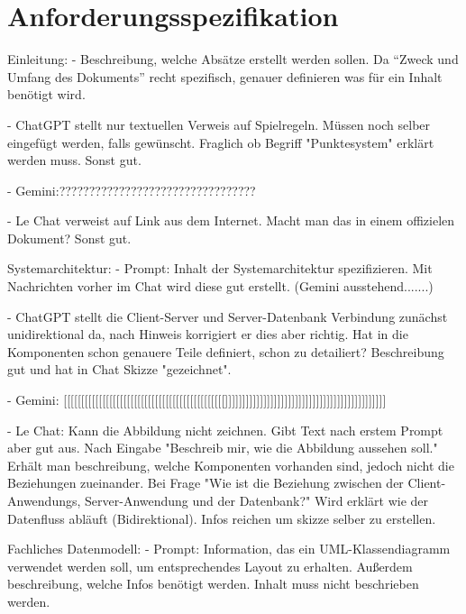 \section{Anforderungsspezifikation}  \label{CompAnforderungsspezifikation}

Einleitung:
- Beschreibung, welche Absätze erstellt werden sollen. Da ``Zweck und Umfang des Dokuments'' recht spezifisch, genauer definieren was für ein 
Inhalt benötigt wird.

- ChatGPT stellt nur textuellen Verweis auf Spielregeln. Müssen noch selber eingefügt werden, falls gewünscht. Fraglich ob Begriff "Punktesystem"
erklärt werden muss. Sonst gut.

- Gemini:?????????????????????????????????

- Le Chat verweist auf Link aus dem Internet. Macht man das in einem offizielen Dokument? Sonst gut.


Systemarchitektur:
- Prompt: Inhalt der Systemarchitektur spezifizieren. Mit Nachrichten vorher im Chat wird diese gut erstellt. (Gemini ausstehend.......)

- ChatGPT stellt die Client-Server und Server-Datenbank Verbindung zunächst unidirektional da, nach Hinweis korrigiert 
er dies aber richtig. Hat in die Komponenten schon genauere Teile definiert, schon zu detailiert? Beschreibung gut und 
hat in Chat Skizze "gezeichnet".

- Gemini: [[[[[[[[[[[[[[[[[[[[[[[[[[[[[[[[[[[[[[[[[[[[[[]]]]]]]]]]]]]]]]]]]]]]]]]]]]]]]]]]]]]]]]]]]]]]

- Le Chat: Kann die Abbildung nicht zeichnen. Gibt Text nach erstem Prompt aber gut aus. Nach Eingabe "Beschreib mir, 
wie die Abbildung aussehen soll." Erhält man beschreibung, welche Komponenten vorhanden sind, jedoch nicht die 
Beziehungen zueinander. Bei Frage "Wie ist die Beziehung zwischen der Client-Anwendungs, Server-Anwendung und der 
Datenbank?" Wird erklärt wie der Datenfluss abläuft (Bidirektional). Infos reichen um skizze selber zu erstellen.


Fachliches Datenmodell:
- Prompt: Information, das ein UML-Klassendiagramm verwendet werden soll, um entsprechendes Layout zu erhalten. 
Außerdem beschreibung, welche Infos benötigt werden. Inhalt muss nicht beschrieben werden.


